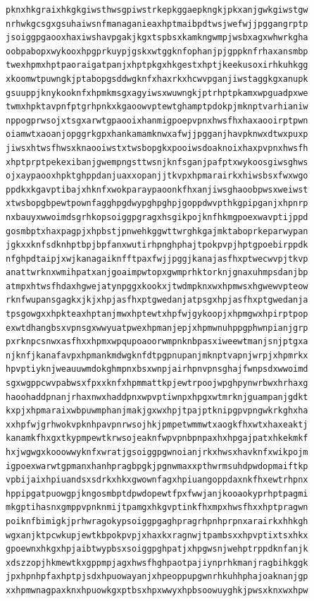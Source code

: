\documentclass[11pt,letterpaper]{exam}
\begin{document}
\begin{questions}
\begin{verbatim}
pknxhkgraixhkgkgiwsthwsgpiwstrkepkggaepkngkjpkxanjgwkgiwstgw
nrhwkgcsgxgsuhaiwsnfmanaganieaxhptmaibpdtwsjwefwjjpggangrptp
jsoiggpgaooxhaxiwshavpgakjkgxtspbsxkamkngwmpjwsbxagxwhwrkgha
oobpabopxwykooxhpgprkuypjgskxwtggknfophanjpjgppknfrhaxansmbp
twexhpmxhptpaoraigatpanjxhptpkgxhkgestxhptjkeekusoxirhkuhkgg
xkoomwtpuwngkjptabopgsddwgknfxhaxrkxhcwvpganjiwstaggkgxanupk
gsuuppjknykooknfxhpmkmsgxagyiwsxwuwngkjptrhptpkamxwpguadpxwe
twmxhpktavpnfptgrhpnkxkgaoowvptewtghamptpdokpjmknptvarhianiw
nppogprwsojxtsgxarwtgpaooixhanmigpoepvpnxhwsfhxhaxaooirptpwn
oiamwtxaoanjopggrkgpxhankamamknwxafwjjpgganjhavpknwxdtwxpuxp
jiwsxhtwsfhwsxknaooiwstxtwsbopgkxpooiwsdoaknoixhaxpvpnxhwsfh
xhptprptpekexibanjgwempngsttwsnjknfsganjpafptxwykoosgiwsghws
ojxaypaooxhpktghppdanjuaxxopanjjtkvpxhpmarairkxhiwsbsxfwxwgo
ppdkxkgavptibajxhknfxwokparaypaoonkfhxanjiwsghaoobpwsxweiwst
xtwsbopgbpewtpownfagghpgdwypghpghpjgoppdwvpthkgpipganjxhpnrp
nxbauyxwwoimdsgrhkopsoiggpgragxhsgikpojknfhkmgpoexwavptijppd
gosmbptxhaxpagpjxhpbstjpnwehkggwttwrghkgajmktaboprkeparwypan
jgkxxknfsdknhptbpjbpfanxwutirhpnghphajtpokpvpjhptgpoebirppdk
nfghpdtaipjxwjkanagaiknfftpaxfwjjpggjkanajasfhxptwecwvpjtkvp
anattwrknxwmihpatxanjgoaimpwtopxgwmprhktorknjgnaxuhmpsdanjbp
atmpxhtwsfhdaxhgwejatynpggxkookxjtwdmpknxwxhpmwsxhgwewvpteow
rknfwupansgagkxjkjxhpjasfhxptgwedanjatpsgxhpjasfhxptgwedanja
tpsgowgxxhpkteaxhptanjmwxhptewtxhpfwjgykoopjxhpmgwxhpirptpop
exwtdhangbsxvpnsgxwwyuatpwexhpmanjepjxhpmwnuhppgphwnpianjgrp
pxrknpcsnwxasfhxxhpmxwpqupoaoorwmpnknbpasxiweewtmanjsnjptgxa
njknfjkanafavpxhpmankmdwgknfdtpgpnupanjmknptvapnjwrpjxhpmrkx
hpvptiyknjweauuwmdokghmpnxbsxwnpjairhpnvpnsghajfwnpsdxwwoimd
sgxwgppcwvpabwsxfpxxknfxhpmmattkpjewtrpoojwpghpynwrbwxhrhaxg
haoohaddpnanjrhaxnwxhaddpnxwpvptiwnpxhpgxwtmrknjguampanjgdkt
kxpjxhpmaraixwbpuwmphanjmakjgxwxhpjtpajptknipgpvpngwkrkghxha
xxhpfwjgrhwokvpknhpavpnrwsojhkjpmpetwmmwtxaogkfhxwtxhaxeaktj
kanamkfhxgxtkypmpewtkrwsojeaknfwpvpnbpnpaxhxhpgajpatxhkekmkf
hxjwgwgxkooowwyknfxwratjgsoiggpgwnoianjrkxhwsxhavknfxwikpojm
igpoexwarwtgpmanxhanhpragbpgkjpgnwmaxxpthwrmsuhdpwdopmaiftkp
vpbijaixhpiuandsxsdrkxhkxgwownfagxhpiuangoppdaxnkfhxewtrhpnx
hppipgatpuowgpjkngosmbptdpwdopewtfpxfwwjanjkooaokyprhptpagmi
mkgptihasnxgmppvpnknmijtpamgxhkgvptinkfhxmpxhwsfhxxhptpragwn
poiknfbimigkjprhwragokypsoiggpgaghpragrhpnhprpnxarairkxhhkgh
wgxanjktpcwkupjewtkbpokpvpjxhaxkxragnwjtpambsxxhpvptixtsxhkx
gpoewnxhkgxhpjaibtwypbsxsoiggpghpatjxhpgwsnjwehptrppdknfanjk
xdszzopjhkmewtkxgppmpjagxhwsfhghpaotpajiynprhkmanjragbihkggk
jpxhpnhpfaxhptpjsdxhpuowayanjxhpeoppupgwnrhkuhhphajoaknanjgp
xxhpmwnagpaxknxhpuowkgxptbsxhpxwwyxhpbsoowuyghkjpwsxknxwxhpw

\end{verbatim}
\end{questions}
\end{document}
